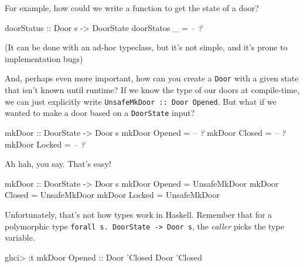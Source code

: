 \documentclass[]{article}
\newenvironment{Shaded}{}{}
\newcommand{\DataTypeTok}[1]{\textcolor[rgb]{0.56,0.13,0.00}{#1}}
\newcommand{\CharTok}[1]{\textcolor[rgb]{0.25,0.44,0.63}{#1}}
\newcommand{\CommentTok}[1]{\textcolor[rgb]{0.38,0.63,0.69}{\textit{#1}}}
\newcommand{\OtherTok}[1]{\textcolor[rgb]{0.00,0.44,0.13}{#1}}
\newcommand{\FunctionTok}[1]{\textcolor[rgb]{0.02,0.16,0.49}{#1}}
\newcommand{\NormalTok}[1]{#1}
\begin{document}
For example, how could we write a function to get the state of a door?

\begin{Shaded}
\begin{Highlighting}[]
\OtherTok{doorStatus ::} \DataTypeTok{Door}\NormalTok{ s }\OtherTok{->} \DataTypeTok{DoorState}
\NormalTok{doorStatos _ }\FunctionTok{=} \CommentTok{-- ?}
\end{Highlighting}
\end{Shaded}

(It can be done with an ad-hoc typeclass, but it's not simple, and it's prone to
implementation bugs)

And, perhaps even more important, how can you create a \texttt{Door} with a
given state that isn't known until runtime? If we know the type of our doors at
compile-time, we can just explicitly write
\texttt{UnsafeMkDoor\ ::\ Door\ \textquotesingle{}Opened}. But what if we wanted
to make a door based on a \texttt{DoorState} input?

\begin{Shaded}
\begin{Highlighting}[]
\OtherTok{mkDoor ::} \DataTypeTok{DoorState} \OtherTok{->} \DataTypeTok{Door}\NormalTok{ s}
\NormalTok{mkDoor }\DataTypeTok{Opened} \FunctionTok{=} \CommentTok{-- ?}
\NormalTok{mkDoor }\DataTypeTok{Closed} \FunctionTok{=} \CommentTok{-- ?}
\NormalTok{mkDoor }\DataTypeTok{Locked} \FunctionTok{=} \CommentTok{-- ?}
\end{Highlighting}
\end{Shaded}

Ah hah, you say. That's easy!

\begin{Shaded}
\begin{Highlighting}[]
\OtherTok{mkDoor ::} \DataTypeTok{DoorState} \OtherTok{->} \DataTypeTok{Door}\NormalTok{ s}
\NormalTok{mkDoor }\DataTypeTok{Opened} \FunctionTok{=} \DataTypeTok{UnsafeMkDoor}
\NormalTok{mkDoor }\DataTypeTok{Closed} \FunctionTok{=} \DataTypeTok{UnsafeMkDoor}
\NormalTok{mkDoor }\DataTypeTok{Locked} \FunctionTok{=} \DataTypeTok{UnsafeMkDoor}
\end{Highlighting}
\end{Shaded}

Unfortunately, that's not how types work in Haskell. Remember that for a
polymorphic type \texttt{forall\ s.\ DoorState\ -\textgreater{}\ Door\ s}, the
\emph{caller} picks the type variable.

\begin{Shaded}
\begin{Highlighting}[]
\NormalTok{ghci}\FunctionTok{>} \FunctionTok{:}\NormalTok{t mkDoor }\DataTypeTok{Opened}\OtherTok{ ::} \DataTypeTok{Door} \CharTok{'Closed}
\DataTypeTok{Door} \CharTok{'Closed}
\end{Highlighting}
\end{Shaded}
\end{document}
